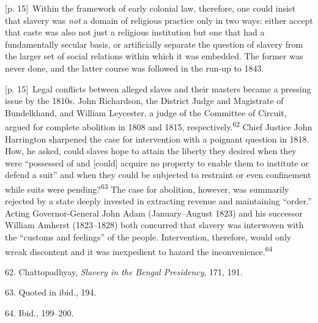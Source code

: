 \documentclass[10pt,a4paper]{article}
\begin{document}
{\scriptsize\color{gray} [p. 15]}\ Within the framework of early colonial law, therefore, one could insist that slavery was \textit{not} a domain of religious practice only in two ways: either accept that caste was also not just a religious institution but one that had a fundamentally secular basis, or artificially separate the question of slavery from the larger set of social relations within which it was embedded. The former was never done, and the latter course was followed in the run-up to 1843.\par
{\scriptsize\color{gray} [p. 15]}\ Legal conflicts between alleged slaves and their masters became a pressing issue by the 1810s. John Richardson, the District Judge and Magistrate of Bundelkhand, and William Leycester, a judge of the Committee of Circuit, argued for complete abolition in 1808 and 1815, respectively.\nobreak\textsuperscript{62} Chief Justice John Harrington sharpened the case for intervention with a poignant question in 1818. How, he asked, could slaves hope to attain the liberty they desired when they were “possessed of and [could] acquire no property to enable them to institute or defend a suit” and when they could be subjected to restraint or even confinement while suits were pending?\nobreak\textsuperscript{63} The case for abolition, however, was summarily rejected by a state deeply invested in extracting revenue and maintaining “order.” Acting Governor-General John Adam (January–August 1823) and his successor William Amherst (1823–1828) both concurred that slavery was interwoven with the “customs and feelings” of the people. Intervention, therefore, would only wreak discontent and it was inexpedient to hazard the inconvenience.\nobreak\textsuperscript{64}\par{\small 62. Chattopadhyay, \textit{Slavery in the Bengal Presidency}, 171, 191.\par}{\small 63. Quoted in ibid., 194.\par}{\small 64. Ibid., 199–200.\par}
\end{document}
